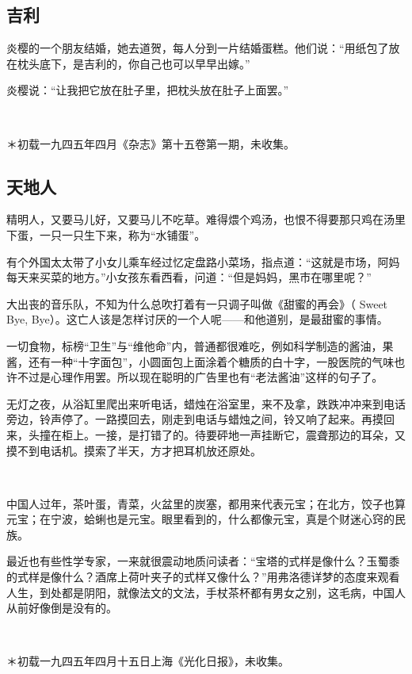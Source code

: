 \subsection{吉利}

\par 炎樱的一个朋友结婚，她去道贺，每人分到一片结婚蛋糕。他们说：“用纸包了放在枕头底下，是吉利的，你自己也可以早早出嫁。”
\par 炎樱说：“让我把它放在肚子里，把枕头放在肚子上面罢。”
\par  
\par ＊初载一九四五年四月《杂志》第十五卷第一期，未收集。


\subsection{天地人}

\par 精明人，又要马儿好，又要马儿不吃草。难得煨个鸡汤，也恨不得要那只鸡在汤里下蛋，一只一只生下来，称为“水铺蛋”。
\par 有个外国太太带了小女儿乘车经过忆定盘路小菜场，指点道：“这就是市场，阿妈每天来买菜的地方。”小女孩东看西看，问道：“但是妈妈，黑市在哪里呢？”
\par 大出丧的音乐队，不知为什么总吹打着有一只调子叫做《甜蜜的再会》（ Sweet Bye, Bye）。这亡人该是怎样讨厌的一个人呢——和他道别，是最甜蜜的事情。
\par 一切食物，标榜“卫生”与“维他命”内，普通都很难吃，例如科学制造的酱油，果酱，还有一种“十字面包”，小圆面包上面涂着个糖质的白十字，一股医院的气味也许不过是心理作用罢。所以现在聪明的广告里也有“老法酱油”这样的句子了。
\par 无灯之夜，从浴缸里爬出来听电话，蜡烛在浴室里，来不及拿，跌跌冲冲来到电话旁边，铃声停了。一路摸回去，刚走到电话与蜡烛之间，铃又响了起来。再摸回来，头撞在柜上。一接，是打错了的。待要砰地一声挂断它，震聋那边的耳朵，又摸不到电话机。摸索了半天，方才把耳机放还原处。
\par  
\par 中国人过年，茶叶蛋，青菜，火盆里的炭塞，都用来代表元宝；在北方，饺子也算元宝；在宁波，蛤蜊也是元宝。眼里看到的，什么都像元宝，真是个财迷心窍的民族。
\par 最近也有些性学专家，一来就很震动地质问读者：“宝塔的式样是像什么？玉蜀黍的式样是像什么？酒席上荷叶夹子的式样又像什么？”用弗洛德详梦的态度来观看人生，到处都是阴阳，就像法文的文法，手杖茶杯都有男女之别，这毛病，中国人从前好像倒是没有的。
\par  
\par ＊初载一九四五年四月十五日上海《光化日报》，未收集。



